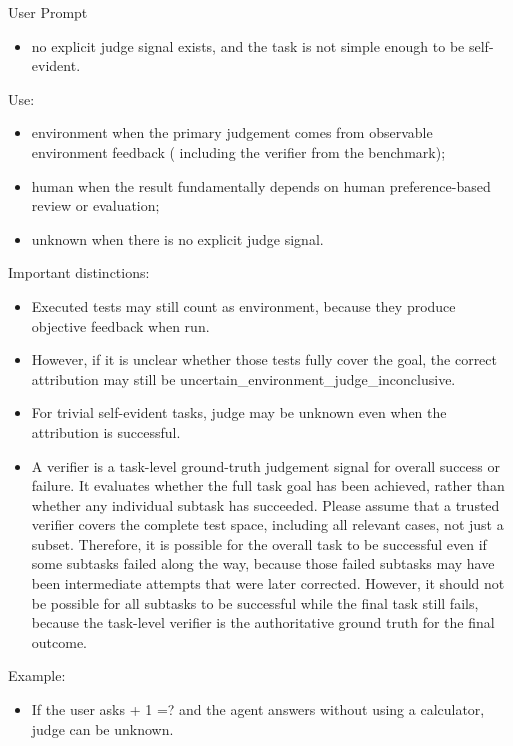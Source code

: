 \documentclass{llmxive}
\providecommand{\svpromptsubheading}[1]{\par\smallskip\noindent{\sffamily\bfseries #1}\par}
\providecommand{\svinlinecode}[1]{{\ttfamily #1}}
\begin{document}
\begin{svpromptbox}{User Prompt}
\begin{itemize}
\item no explicit judge signal exists, and the task is not simple enough to be self-evident.
\end{itemize}
\smallskip
\svpromptsubheading{Judge}
\smallskip
Use:\par
\smallskip
\begin{itemize}
\item \svinlinecode{environment} when the primary judgement comes from observable environment feedback ( including the verifier from the benchmark);
\item \svinlinecode{human} when the result fundamentally depends on human preference-based review or evaluation;
\item \svinlinecode{unknown} when there is no explicit judge signal.
\end{itemize}
\smallskip
Important distinctions:\par
\smallskip
\begin{itemize}
\item Executed tests may still count as \svinlinecode{environment}, because they produce objective feedback when run.
\item However, if it is unclear whether those tests fully cover the goal, the correct attribution may still be \svinlinecode{uncertain\_environment\_judge\_inconclusive}.
\item For trivial self-evident tasks, \svinlinecode{judge} may be \svinlinecode{unknown} even when the attribution is successful.
\item A verifier is a task-level ground-truth judgement signal for overall success or failure. It evaluates whether the full task goal has been achieved, rather than whether any individual subtask has succeeded. Please assume that a trusted verifier covers the complete test space, including all relevant cases, not just a subset. Therefore, it is possible for the overall task to be successful even if some subtasks failed along the way, because those failed subtasks may have been intermediate attempts that were later corrected. However, it should not be possible for all subtasks to be successful while the final task still fails, because the task-level verifier is the authoritative ground truth for the final outcome.
\end{itemize}
\smallskip
Example:\par
\smallskip
\begin{itemize}
\item If the user asks \svinlinecode{1 + 1 =?} and the agent answers \svinlinecode{2} without using a calculator, \svinlinecode{judge} can be \svinlinecode{unknown}.

\end{itemize}
\end{svpromptbox}
\end{document}
